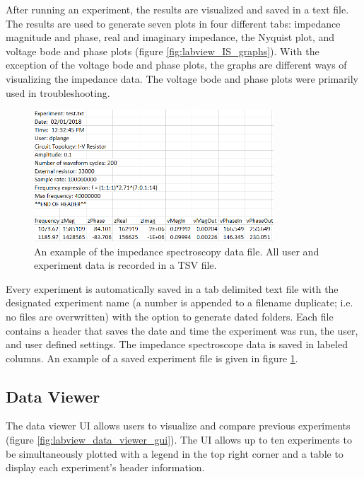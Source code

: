 \par After running an experiment, the results are visualized and saved in a text file. The results are used to generate seven plots in four different tabs: impedance magnitude and phase, real and imaginary impedance, the Nyquist plot, and voltage bode and phase plots (figure \ref{fig:labview_IS_graphs}). With the exception of the voltage bode and phase plots, the graphs are different ways of visualizing the impedance data. The voltage bode and phase plots were primarily used in troubleshooting. 


\begin{figure}[h]
    \centering
    \includegraphics[width=0.8\textwidth]{images/labview_data.png}
    \caption[Software generated IS file.]{An example of the impedance spectroscopy data file. All user and experiment data is recorded in a TSV file.}
    \label{fig:labview_data}
\end{figure}

\par Every experiment is automatically saved in a tab delimited text file with the designated experiment name (a number is appended to a filename duplicate; i.e. no files are overwritten) with the option to generate dated folders. Each file contains a header that saves the date and time the experiment was run, the user, and user defined settings. The impedance spectroscope data is saved in labeled columns. An example of a saved experiment file is given in figure \ref{fig:labview_data}.
\FloatBarrier

\subsection{Data Viewer}

\par The data viewer UI allows users to visualize and compare previous experiments (figure \ref{fig:labview_data_viewer_gui}). The UI allows up to ten experiments to be simultaneously plotted with a legend in the top right corner and a table to display each experiment's header information.

